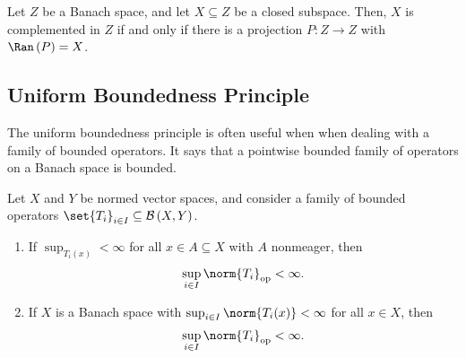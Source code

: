 \documentclass[10pt]{mypackage}
\begin{document}
  \begin{corollary}
    Let $Z$ be a Banach space, and let $X\subseteq Z$ be a closed subspace. Then, $X$ is complemented in $Z$ if and only if there is a projection $P: Z\rightarrow Z$ with $\Ran\left(P\right) = X$.
  \end{corollary}
  \subsection{Uniform Boundedness Principle}%
  The uniform boundedness principle is often useful when when dealing with a family of bounded operators. It says that a pointwise bounded family of operators on a Banach space is bounded.
  \begin{theorem}
    Let $X$ and $Y$ be normed vector spaces, and consider a family of bounded operators $\set{T_i}_{i\in I}\subseteq \mathcal{B}\left(X,Y\right)$.
    \begin{enumerate}[(1)]
      \item If $\sup_{T_i(x)} < \infty$ for all $x\in A\subseteq X$ with $A$ nonmeager, then
        \begin{align*}
          \sup_{i\in I}\norm{T_i}_{\text{op}} < \infty.
        \end{align*}
      \item If $X$ is a Banach space with $\sup_{i\in I}\norm{T_i(x)} < \infty$ for all $x\in X$, then
        \begin{align*}
          \sup_{i\in I}\norm{T_i}_{\text{op}} < \infty.
        \end{align*}
    \end{enumerate}
  \end{theorem}
\end{document}
